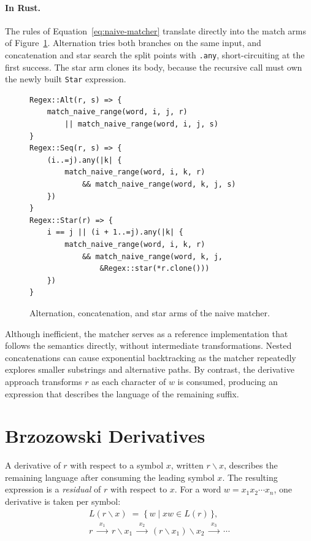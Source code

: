 %

\paragraph{In Rust.}
The rules of Equation~\eqref{eq:naive-matcher} 
translate directly into the match arms of Figure~\ref{fig:match-naive-rust}. 
Alternation tries both branches on the same input, 
and concatenation and star search the split points with \texttt{.any}, 
short-circuiting at the first success. 
The star arm clones its body, 
because the recursive call must own the newly built \texttt{Star} expression.

\begin{figure}[H]
\small
\begin{verbatim}
Regex::Alt(r, s) => {
    match_naive_range(word, i, j, r)
        || match_naive_range(word, i, j, s)
}
Regex::Seq(r, s) => {
    (i..=j).any(|k| {
        match_naive_range(word, i, k, r)
            && match_naive_range(word, k, j, s)
    })
}
Regex::Star(r) => {
    i == j || (i + 1..=j).any(|k| {
        match_naive_range(word, i, k, r)
            && match_naive_range(word, k, j,
                &Regex::star(*r.clone()))
    })
}
\end{verbatim}
\caption{Alternation, concatenation, and star arms of the naive matcher.}
\label{fig:match-naive-rust}
\end{figure}

Although inefficient, the matcher serves as a reference implementation
that follows the semantics directly, without intermediate transformations.
Nested concatenations can cause exponential backtracking 
as the matcher repeatedly explores smaller substrings and alternative paths. 
By contrast, the derivative approach transforms \(r\) 
as each character of \(w\) is consumed, 
producing an expression that describes the language of the remaining suffix.

%
%
%

\section{Brzozowski Derivatives}
\label{sec:brzozowski-derivatives}

A \citet{brzozowski1964} derivative of $r$ with respect to a symbol $x$,
written $r \backslash x$, describes the remaining language
after consuming the leading symbol $x$.
The resulting expression is a \emph{residual}
of $r$ with respect to $x$.
For a word $w = x_1x_2\cdots x_n$, one derivative is taken per symbol:
\begin{equation}\label{eq:der-23}
\begin{gathered}
L(r \backslash x) \;=\; \{\, w \mid xw \in L(r) \,\}, \\[6pt]
r \;\xrightarrow{\;x_1\;}\; r\backslash x_1
  \;\xrightarrow{\;x_2\;}\; (r\backslash x_1)\backslash x_2
  \;\xrightarrow{\;x_3\;}\; \cdots
\end{gathered}
\end{equation}

